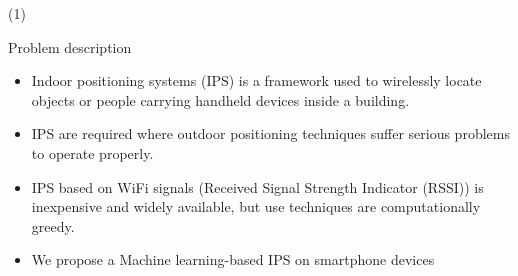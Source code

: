 

\begin{frame}{ \footnotemark (1)}

\begin{block}{Problem description} 
		\begin{itemize}
		\item Indoor positioning systems (IPS) is a framework used to wirelessly locate objects or people carrying handheld devices inside a building.
		\item IPS are required where outdoor positioning techniques suffer serious problems to operate properly.
		\item IPS based on WiFi signals (Received Signal Strength Indicator (RSSI)) is inexpensive and widely available, but use techniques are computationally greedy.
		\item We propose a Machine learning-based IPS on smartphone devices
		\end{itemize}
    
\end{block} 
\setcounter{footnote}{0}
\end{frame}


